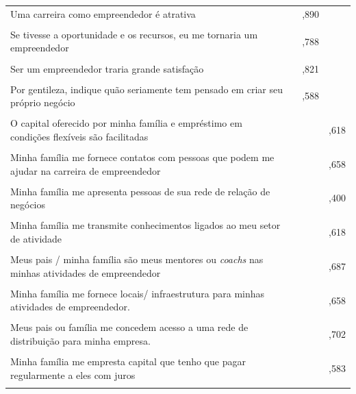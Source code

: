 \begin{apendicesenv}
\begin{longtable}[H]{p{6cm} c c c }
Uma carreira como empreendedor é atrativa
 &  & ,890  & \\\\
 
Se tivesse a oportunidade e os recursos, eu me tornaria um empreendedor
 &  & ,788 & \\\\
 
Ser um empreendedor traria grande satisfação
 &  & ,821 & \\\\
 
Por gentileza, indique quão seriamente tem pensado em criar seu próprio negócio
 &  & ,588 & \\\\
 
O capital oferecido por minha família e empréstimo em condições flexíveis são facilitadas
 &  & & ,618 \\\\
 
Minha família me fornece contatos com pessoas que podem me ajudar na carreira de empreendedor
 &  & & ,658 \\\\
 
Minha família me apresenta pessoas de sua rede de relação de negócios
 &  & & ,400 \\\\
 
Minha família me transmite conhecimentos ligados ao meu setor de atividade
 &  & & ,618 \\\\
 
Meus pais / minha família são meus mentores ou \textit{coachs} nas minhas atividades de empreendedor
 &  & & ,687 \\\\
 
Minha família me fornece locais/ infraestrutura para minhas atividades de empreendedor.
 &  & & ,658 \\\\
 
Meus pais ou família me concedem acesso a uma rede de distribuição para minha empresa.
 &  & & ,702 \\\\
 
 
Minha família me empresta capital que  tenho que pagar regularmente a eles com juros		
 &  & & ,583 \\\\
 

\end{longtable}
\end{apendicesenv}
